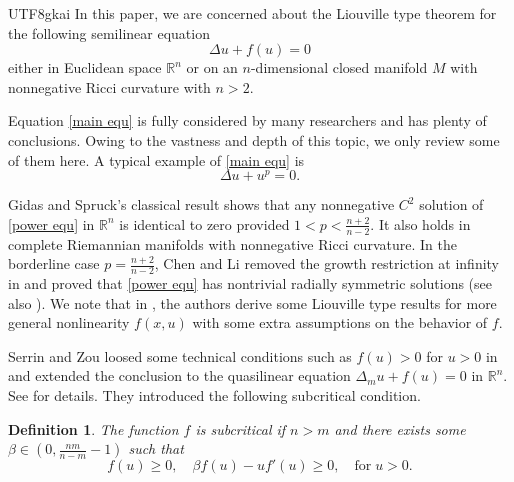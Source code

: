 \documentclass[reqno,12pt]{amsart}
\newcommand{\text}{\mbox}
\numberwithin{equation}{section}
\newtheorem{defn}[thm]{Definition}
\newcommand{\bR}{{\mathbb R}}  %
\begin{document}
\begin{CJK}{UTF8}{gkai}
		In this paper, we are concerned about the Liouville type theorem for the following semilinear equation 
		\begin{equation}\label{main equ}
			\Delta u+f(u)=0
		\end{equation}
		either in Euclidean space $\bR^{n}$ or on an $n$-dimensional closed manifold $M$ with nonnegative Ricci curvature with $n>2$.
		
		  Equation \eqref{main equ} is fully considered by many researchers and has plenty of conclusions. Owing to the vastness and depth of this topic, we only review some of them here.
		  A typical example of \eqref{main equ} is
		  \begin{equation}\label{power equ}
		  		\Delta u+u^{p}=0.
		  \end{equation}
		  
		    Gidas and Spruck's classical result \cite{GS} shows  that any nonnegative $C^{2}$ solution of \eqref{power equ} in $\bR^{n}$ is identical to zero provided $1< p< \frac{n+2}{n-2}$.
		  It also holds in complete Riemannian manifolds with nonnegative Ricci curvature. In the borderline case $p=\frac{n+2}{n-2}$, Chen and Li \cite{CL} removed the growth restriction at infinity in \cite{GNN} and  proved that \eqref{power equ} has nontrivial radially symmetric solutions  (see also \cite{CGS}). We note that in \cite[Theorem 6.1]{GS}, the authors derive some Liouville type results for more general nonlinearity  $f(x,u)$ with some extra assumptions on the behavior of $f$. 
		  
		  Serrin and Zou \cite{SZ} loosed some technical conditions such as $f(u)>0$ for $u>0$ in \cite{GS}  and extended the conclusion to the quasilinear equation $\Delta_{m}u+f(u)=0$ in $\bR^{n}$. See \cite[Theorem II]{SZ} for details.  They introduced the following subcritical condition. 
		  \begin{defn}\label{subcritical condition1}
		  	The function $f$ is subcritical if $n>m$ and there exists some $\beta\in (0,\frac{nm}{n-m}-1)$ such that
		  	\begin{equation}\label{subcritical formula}
		  		f(u)\ge 0, \quad \beta f(u)-uf'(u)\ge 0, \quad \text{for}\;u>0.
		  	\end{equation}
		  \end{defn}
		  

\end{CJK}
\end{document}
